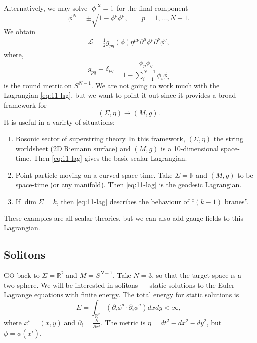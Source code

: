 Alternatively, we may solve $\abs{\phi}^2 = 1$ for the final component
\begin{equation}
  \phi^N = \pm \sqrt{1 - \phi^{p} \phi^{p}}, \qquad p = 1, \dots, N-1.
\end{equation}
We obtain
\begin{align}
  \mathscr{L} = \frac{1}{2} g_{pq}(\phi) \eta^{\mu\nu} \partial^{\mu} \phi^{p} \partial^{\nu} \phi^{q}, \label{eq:11-lag}
\end{align}
where,
\begin{equation}
  g_{pq} = \delta_{pq} + \frac{\phi_p \phi_q}{1 - \sum_{i=1}^{N-1} \phi_i \phi_i}
\end{equation}
is the round metric on $S^{N-1}$.
We are not going to work much with the Lagrangian \eqref{eq:11-lag}, but we want to point it out since it provides a broad framework for
\begin{equation}
  (\Sigma, \eta) \to (M, g).
\end{equation}
It is useful in a variety of situations:
\begin{enumerate}[1)]
  \item Bosonic sector of superstring theory. In this framework, $(\Sigma, \eta)$ the string worldsheet (2D Riemann surface) and $(M, g)$ is a 10-dimensional space-time.
    Then \eqref{eq:11-lag} gives the basic scalar Lagrangian.
  \item Point particle moving on a curved space-time. Take $\Sigma = \mathbb{R}$ and $(M, g)$ to be space-time (or any manifold).
    Then \eqref{eq:11-lag} is the geodesic Lagrangian.
  \item If $\dim \Sigma = k$, then \eqref{eq:11-lag} describes the behaviour of ``$(k-1)$ branes''.
\end{enumerate}
These examples are all scalar theories, but we can also add gauge fields to this Lagrangian.

\subsection{Solitons}%
\label{sub:solitons}

GO back to $\Sigma = \mathbb{R}^{2}$ and $M= S^{N-1}$.
Take $N = 3$, so that the target space is a two-sphere.
We will be interested in solitons --- static solutions to the Euler--Lagrange equations with finite energy.
The total energy for static solutions is
\begin{equation}
  E = \int_{\mathbb{R}^2} (\partial_{i} \phi^{a} \cdot \partial_{i} \phi^{a}) dx dy < \infty,
\end{equation}
where $x^{i} = (x, y)$ and $\partial_{i} = \frac{\partial }{\partial x^{i}}$.
The metric is $\eta = dt^2 - dx^2 - dy^2$, but $\phi = \phi(x^{i})$.


